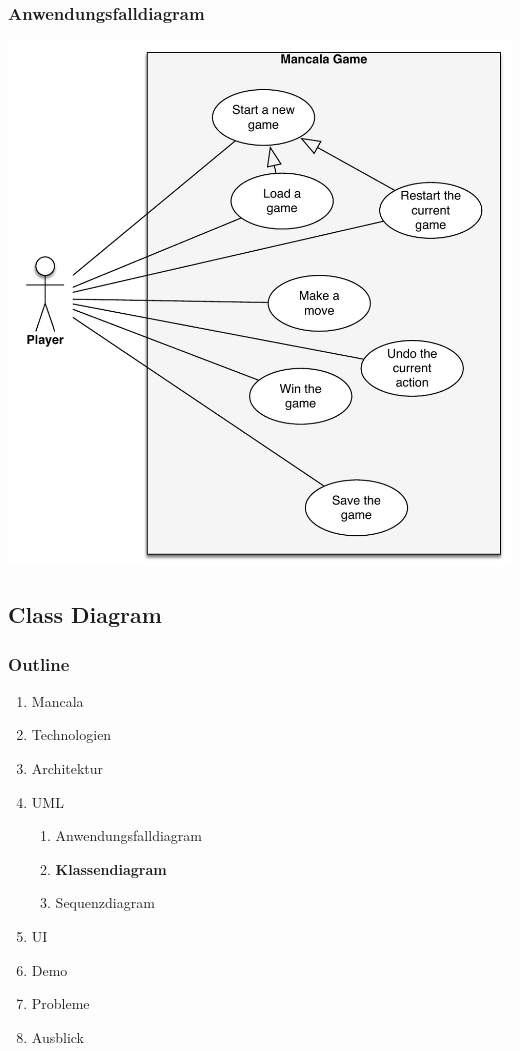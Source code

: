 \documentclass[
	10pt,
	t		%
]{beamer}
\begin{document}
\begin{frame}
\frametitle{Anwendungsfalldiagram}
\begin{center}
\includegraphics[scale=0.32]{./../Diagrams/UseCases.pdf}
\end{center}
\end{frame}

\subsection{Class Diagram}
\begin{frame}
\frametitle{Outline}
\begin{enumerate}
\item Mancala
\item Technologien
\item Architektur
\item UML
\begin{enumerate}
\item Anwendungsfalldiagram
\item \textbf{Klassendiagram}
\item Sequenzdiagram
\end{enumerate}
\item UI
\item Demo
\item Probleme
\item Ausblick
\end{enumerate}
\end{frame}
\end{document}
